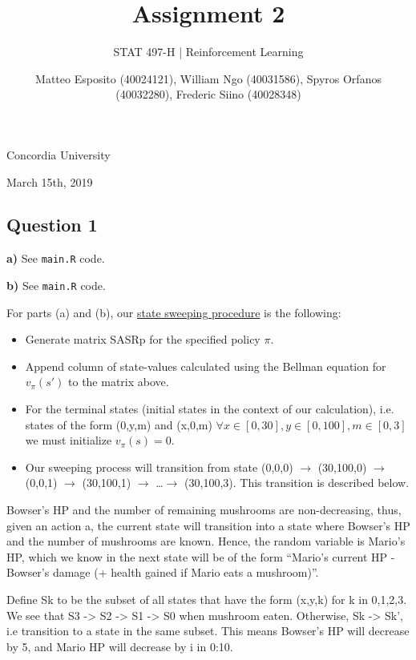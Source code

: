 \documentclass[a4paper,12pt]{article}
\title{\textbf{Assignment 2}}
\author{STAT 497-H | Reinforcement Learning}
\date{Matteo Esposito (40024121), William Ngo (40031586), Spyros Orfanos (40032280), Frederic Siino (40028348)}
\def\code#1{\texttt{#1}}
\begin{document}
\begin{titlingpage}
  \maketitle
  \centering
  \vfill
  {\large{Concordia University}}\par
  {\large{March 15th, 2019}}
\end{titlingpage}

\newpage

\subsection*{Question 1}

\textbf{a)} See \code{main.R} code.

\textbf{b)} See \code{main.R} code.

For parts (a) and (b), our \underline{state sweeping procedure} is the following: 

\begin{itemize}
  \item Generate matrix SASRp for the specified policy $\pi$. 
  \item Append column of state-values calculated using the Bellman equation for $v_{\pi}(s')$ to the matrix above.
  \item For the terminal states (initial states in the context of our calculation), i.e. states of the form
        (0,y,m) and (x,0,m) $\forall x \in [0,30], y \in [0,100], m \in [0,3]$ we must initialize $v_{\pi}(s) = 0$.
  \item Our sweeping process will transition from state (0,0,0) $\longrightarrow$ (30,100,0) $\longrightarrow$ 
        (0,0,1) $\longrightarrow$ (30,100,1) $\longrightarrow$ \ldots $\longrightarrow$ (30,100,3). This transition
        is described below.
\end{itemize}

Bowser’s HP and the number of remaining mushrooms are non-decreasing, 
thus, given an action a, the current state will transition into a state 
where Bowser’s HP and the number of mushrooms are known. Hence, the random 
variable is Mario’s HP, which we know in the next state will be of the
form “Mario’s current HP - Bowser’s damage (+ health gained if Mario 
eats a mushroom)”.

Define Sk to be the subset of all states that have the form (x,y,k) for 
k in 0,1,2,3. We see that S3 -> S2 -> S1 -> S0 when mushroom eaten.
Otherwise, Sk -> Sk’, i.e transition to a state in the same subset. 
This means Bowser’s HP will decrease by 5, and Mario HP will decrease 
by i in 0:10. 
\end{document}
